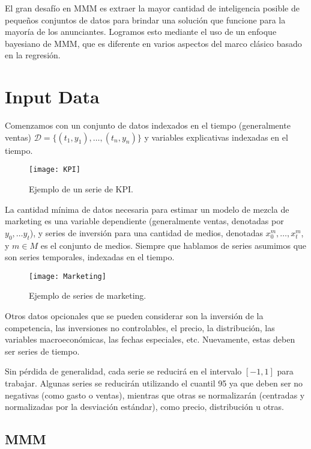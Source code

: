 El gran desafío en MMM es extraer la mayor cantidad de inteligencia posible de pequeños conjuntos de datos para brindar una solución que funcione para la mayoría de los anunciantes. Logramos esto mediante el uso de un enfoque bayesiano de MMM, que es diferente en varios aspectos del marco clásico basado en la regresión.


\section{Input Data}

Comenzamos con un conjunto de datos indexados en el tiempo (generalmente ventas) \(\mathcal{D} = \{(t_1, y_1), \dotsc, (t_n, y_n)\}\) y variables explicativas indexadas en el tiempo.

\begin{figure}[h]
	\centering
	\texttt{[image: KPI]}
	\caption{Ejemplo de un serie de KPI.}\label{KPI}
\end{figure}

La cantidad mínima de datos necesaria para estimar un modelo de mezcla de marketing es una variable dependiente (generalmente ventas, denotadas por \(y_0, \dotsc y_t\)), y series de inversión para una cantidad de medios, denotadas \(x_0^m, \dotsc, x_t^m\), y \(m \in M\) es el conjunto de medios. Siempre que hablamos de series asumimos que son series temporales, indexadas en el tiempo.


\begin{figure}[h]
	\centering
	\texttt{[image: Marketing]}
	\caption{Ejemplo de series de marketing.}\label{Marketing}
\end{figure}

Otros datos opcionales que se pueden considerar son la inversión de la competencia, las inversiones no controlables, el precio, la distribución, las variables macroeconómicas, las fechas especiales, etc. Nuevamente, estas deben ser series de tiempo.

Sin pérdida de generalidad, cada serie se reducirá en el intervalo \([-1, 1]\) para trabajar. Algunas series se reducirán utilizando el cuantil 95 ya que deben ser no negativas (como gasto o ventas), mientras que otras se normalizarán (centradas y normalizadas por la desviación estándar), como precio, distribución u otras.

\subsection{MMM}


